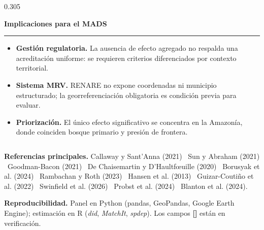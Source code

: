 \documentclass[final,t]{beamer}
\newcommand{\seccion}[2]{%
  \par\vspace{0.5\baselineskip}%
  {\color{dosel}\Large\bfseries #1\hfill{\color{tenue}\normalsize\mdseries #2}}\par
  \vspace{-0.35\baselineskip}%
  {\color{dosel}\rule{\linewidth}{2.2pt}}\par
  \vspace{0.25\baselineskip}%
}
\begin{document}
\begin{frame}[t]{}
\begin{columns}[t]
\begin{column}{0.305\paperwidth}
\seccion{Implicaciones para el MADS}{}
\begin{caja}[politicafondo]{}
\begin{itemize}
  \item \textbf{Gestión regulatoria.} La ausencia de efecto agregado no respalda una acreditación
        uniforme: se requieren criterios diferenciados por contexto territorial.
  \item \textbf{Sistema MRV.} RENARE no expone coordenadas ni municipio estructurado;
        la georreferenciación obligatoria es condición previa para evaluar.
  \item \textbf{Priorización.} El único efecto significativo se concentra en la Amazonía,
        donde coinciden bosque primario y presión de frontera.
\end{itemize}
\end{caja}

\end{column}
\end{columns}

\vfill

\colorbox{tinta}{%
\begin{minipage}[t]{\dimexpr\paperwidth-2.4cm\relax}
\vspace{0.7cm}
\hspace{0.8cm}%
\begin{minipage}[t]{0.63\linewidth}
  {\color{papel!65}\small\textbf{\color{papel}Referencias principales.}
  Callaway y Sant'Anna (2021) \textbullet\ Sun y Abraham (2021) \textbullet\ Goodman-Bacon (2021)
  \textbullet\ De Chaisemartin y D'Haultf\oe uille (2020) \textbullet\ Borusyak et al. (2024)
  \textbullet\ Rambachan y Roth (2023) \textbullet\ Hansen et al. (2013)
  \textbullet\ Guizar-Coutiño et al. (2022) \textbullet\ Swinfield et al. (2026)
  \textbullet\ Probst et al. (2024) \textbullet\ Blanton et al. (2024).}
\end{minipage}\hfill
\begin{minipage}[t]{0.32\linewidth}
  {\color{papel!65}\small\textbf{\color{papel}Reproducibilidad.}
  Panel en Python (pandas, GeoPandas, Google Earth Engine); estimación en R
  (\textit{did}, \textit{MatchIt}, \textit{spdep}). Los campos
  \textcolor{amazonia}{\textbf{[\textbullet]}} están en verificación.}
\end{minipage}
\hspace{0.8cm}
\vspace{0.7cm}
\end{minipage}}

\end{frame}
\end{document}
